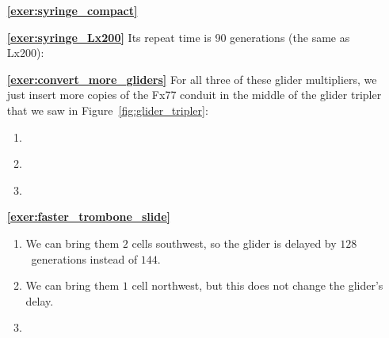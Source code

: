\begin{multicols}{2}
\begin{itemize}[leftmargin=0em]
		
		\item[\bf\color{ocre}\sffamily\ref{exer:syringe_compact}]  \\
		
		
		\clearpage
		
		
		\item[\bf\color{ocre}\sffamily\ref{exer:syringe_Lx200}] Its repeat time is 90 generations (the same as Lx200):
		\begin{center}
		\end{center}
		
		
		\item[\bf\color{ocre}\sffamily\ref{exer:convert_more_gliders}] For all three of these glider multipliers, we just insert more copies of the Fx77 conduit in the middle of the glider tripler that we saw in Figure~\ref{fig:glider_tripler}:
		\begin{enumerate}[leftmargin=1.5em,label=\bf\color{ocre}(\alph*)]
			\item {} \\
			
			\item {} \\
			
			\item {} \\[0.6em]
		\end{enumerate}
	

		\item[\bf\color{ocre}\sffamily\ref{exer:faster_trombone_slide}] \begin{enumerate}[leftmargin=1.5em,label=\bf\color{ocre}(\alph*)]
			\item We can bring them $2$ cells southwest, so the glider is delayed by $128$~generations instead of $144$.
			
			\item We can bring them $1$ cell northwest, but this does not change the glider's delay.
			
			\item {} \\[0.6em]
		\end{enumerate}
		
		
		

\end{itemize}
\end{multicols}
